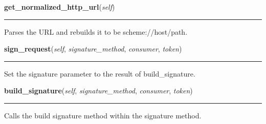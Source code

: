     \label{lib:oauth:OAuthRequest:get_normalized_http_url}

    \vspace{0.5ex}

\hspace{.8\funcindent}\begin{boxedminipage}{\funcwidth}

    \raggedright \textbf{get\_normalized\_http\_url}(\textit{self})

    \vspace{-1.5ex}

    \rule{\textwidth}{0.5\fboxrule}
\setlength{\parskip}{2ex}
    Parses the URL and rebuilds it to be scheme://host/path.

\setlength{\parskip}{1ex}
    \end{boxedminipage}

    \label{lib:oauth:OAuthRequest:sign_request}

    \vspace{0.5ex}

\hspace{.8\funcindent}\begin{boxedminipage}{\funcwidth}

    \raggedright \textbf{sign\_request}(\textit{self}, \textit{signature\_method}, \textit{consumer}, \textit{token})

    \vspace{-1.5ex}

    \rule{\textwidth}{0.5\fboxrule}
\setlength{\parskip}{2ex}
    Set the signature parameter to the result of build\_signature.

\setlength{\parskip}{1ex}
    \end{boxedminipage}

    \label{lib:oauth:OAuthRequest:build_signature}

    \vspace{0.5ex}

\hspace{.8\funcindent}\begin{boxedminipage}{\funcwidth}

    \raggedright \textbf{build\_signature}(\textit{self}, \textit{signature\_method}, \textit{consumer}, \textit{token})

    \vspace{-1.5ex}

    \rule{\textwidth}{0.5\fboxrule}
\setlength{\parskip}{2ex}
    Calls the build signature method within the signature method.

\setlength{\parskip}{1ex}
    \end{boxedminipage}

